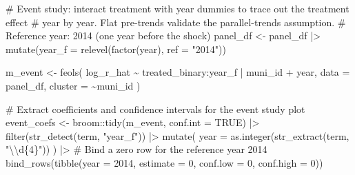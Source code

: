 \documentclass[
  11pt,
  letterpaper,
  DIV=11,
  numbers=noendperiod]{scrartcl}
\newenvironment{Shaded}{}{}
\newcommand{\AttributeTok}[1]{\textcolor[rgb]{0.84,0.23,0.29}{#1}}
\newcommand{\CommentTok}[1]{\textcolor[rgb]{0.42,0.45,0.49}{#1}}
\newcommand{\ConstantTok}[1]{\textcolor[rgb]{0.00,0.36,0.77}{#1}}
\newcommand{\DecValTok}[1]{\textcolor[rgb]{0.00,0.36,0.77}{#1}}
\newcommand{\FunctionTok}[1]{\textcolor[rgb]{0.44,0.26,0.76}{#1}}
\newcommand{\NormalTok}[1]{\textcolor[rgb]{0.14,0.16,0.18}{#1}}
\newcommand{\OtherTok}[1]{\textcolor[rgb]{0.44,0.26,0.76}{#1}}
\newcommand{\SpecialCharTok}[1]{\textcolor[rgb]{0.00,0.36,0.77}{#1}}
\newcommand{\StringTok}[1]{\textcolor[rgb]{0.01,0.18,0.38}{#1}}
\begin{document}
\begin{Shaded}
\begin{Highlighting}[]
\CommentTok{\# Event study: interact treatment with year dummies to trace out the treatment effect}
\CommentTok{\# year by year. Flat pre{-}trends validate the parallel{-}trends assumption.}
\CommentTok{\# Reference year: 2014 (one year before the shock)}
\NormalTok{panel\_df }\OtherTok{\textless{}{-}}\NormalTok{ panel\_df }\SpecialCharTok{|\textgreater{}}
  \FunctionTok{mutate}\NormalTok{(}\AttributeTok{year\_f =} \FunctionTok{relevel}\NormalTok{(}\FunctionTok{factor}\NormalTok{(year), }\AttributeTok{ref =} \StringTok{"2014"}\NormalTok{))}

\NormalTok{m\_event }\OtherTok{\textless{}{-}} \FunctionTok{feols}\NormalTok{(}
\NormalTok{  log\_r\_hat }\SpecialCharTok{\textasciitilde{}}\NormalTok{ treated\_binary}\SpecialCharTok{:}\NormalTok{year\_f }\SpecialCharTok{|}\NormalTok{ muni\_id }\SpecialCharTok{+}\NormalTok{ year,}
  \AttributeTok{data    =}\NormalTok{ panel\_df,}
  \AttributeTok{cluster =} \SpecialCharTok{\textasciitilde{}}\NormalTok{muni\_id}
\NormalTok{)}

\CommentTok{\# Extract coefficients and confidence intervals for the event study plot}
\NormalTok{event\_coefs }\OtherTok{\textless{}{-}}\NormalTok{ broom}\SpecialCharTok{::}\FunctionTok{tidy}\NormalTok{(m\_event, }\AttributeTok{conf.int =} \ConstantTok{TRUE}\NormalTok{) }\SpecialCharTok{|\textgreater{}}
  \FunctionTok{filter}\NormalTok{(}\FunctionTok{str\_detect}\NormalTok{(term, }\StringTok{"year\_f"}\NormalTok{)) }\SpecialCharTok{|\textgreater{}}
  \FunctionTok{mutate}\NormalTok{(}
    \AttributeTok{year =} \FunctionTok{as.integer}\NormalTok{(}\FunctionTok{str\_extract}\NormalTok{(term, }\StringTok{"}\SpecialCharTok{\textbackslash{}\textbackslash{}}\StringTok{d\{4\}"}\NormalTok{))}
\NormalTok{  ) }\SpecialCharTok{|\textgreater{}}
  \CommentTok{\# Bind a zero row for the reference year 2014}
  \FunctionTok{bind\_rows}\NormalTok{(}\FunctionTok{tibble}\NormalTok{(}\AttributeTok{year =} \DecValTok{2014}\NormalTok{, }\AttributeTok{estimate =} \DecValTok{0}\NormalTok{, }\AttributeTok{conf.low =} \DecValTok{0}\NormalTok{, }\AttributeTok{conf.high =} \DecValTok{0}\NormalTok{))}


\end{Highlighting}
\end{Shaded}
\end{document}
